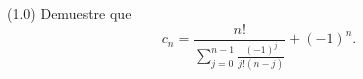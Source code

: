 (1.0) Demuestre que
\[ c_n = \frac{n!}{\displaystyle\sum_{j=0}^{n-1} \frac{(-1)^j}{j!(n-j)}} + (-1)^n. \]
